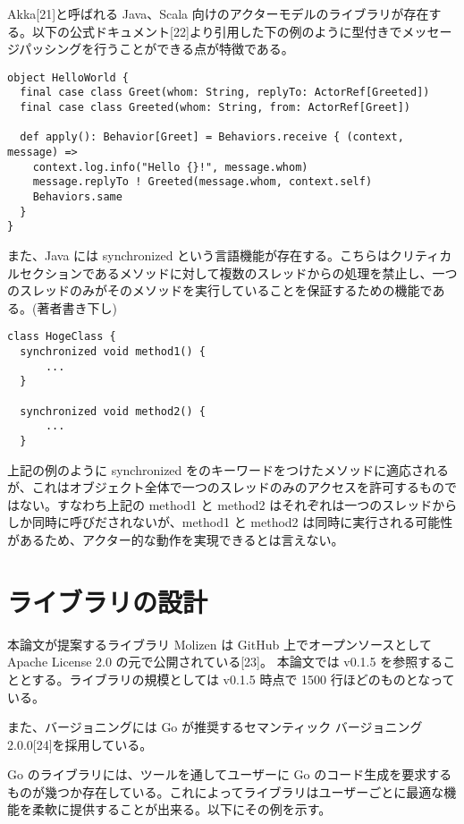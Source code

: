 Akka{[}21{]}と呼ばれる Java、Scala
向けのアクターモデルのライブラリが存在する。以下の公式ドキュメント{[}22{]}より引用した下の例のように型付きでメッセージパッシングを行うことができる点が特徴である。

\begin{verbatim}
object HelloWorld {
  final case class Greet(whom: String, replyTo: ActorRef[Greeted])
  final case class Greeted(whom: String, from: ActorRef[Greet])

  def apply(): Behavior[Greet] = Behaviors.receive { (context, message) =>
    context.log.info("Hello {}!", message.whom)
    message.replyTo ! Greeted(message.whom, context.self)
    Behaviors.same
  }
}
\end{verbatim}

また、Java には synchronized
という言語機能が存在する。こちらはクリティカルセクションであるメソッドに対して複数のスレッドからの処理を禁止し、一つのスレッドのみがそのメソッドを実行していることを保証するための機能である。(著者書き下し)

\begin{verbatim}
class HogeClass {
  synchronized void method1() {
      ...
  }

  synchronized void method2() {
      ...
  }
\end{verbatim}

上記の例のように synchronized
をのキーワードをつけたメソッドに適応されるが、これはオブジェクト全体で一つのスレッドのみのアクセスを許可するものではない。すなわち上記の
method1 と method2
はそれぞれは一つのスレッドからしか同時に呼びだされないが、method1 と
method2
は同時に実行される可能性があるため、アクター的な動作を実現できるとは言えない。

\section{ライブラリの設計}

本論文が提案するライブラリ Molizen は GitHub 上でオープンソースとして
Apache License 2.0 の元で公開されている{[}23{]}。 本論文では v0.1.5
を参照することとする。ライブラリの規模としては v0.1.5 時点で 1500
行ほどのものとなっている。

また、バージョニングには Go が推奨するセマンティック バージョニング
2.0.0{[}24{]}を採用している。

Go のライブラリには、ツールを通してユーザーに Go
のコード生成を要求するものが幾つか存在している。これによってライブラリはユーザーごとに最適な機能を柔軟に提供することが出来る。以下にその例を示す。


